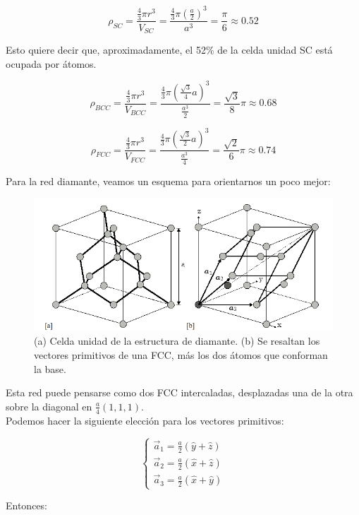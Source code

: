 \documentclass[a4paper]{article}
\begin{document}
$$ \rho_{SC} = \frac{\frac{4}{3}\pi r^{3}}{V_{SC}} = \frac{\frac{4}{3}\pi (\frac{a}{2})^{3}}{a^{3}} = \frac{\pi}{6} \approx 0.52$$

Esto quiere decir que, aproximadamente, el 52\% de la celda unidad SC est\'a ocupada por \'atomos.

$$ \rho_{BCC} = \frac{\frac{4}{3}\pi r^{3}}{V_{BCC}} = \frac{\frac{4}{3}\pi (\frac{\sqrt{3}}{4}a)^{3}}{\frac{a^{3}}{2}} = \frac{\sqrt{3}}{8}\pi \approx 0.68$$

$$ \rho_{FCC} = \frac{\frac{4}{3}\pi r^{3}}{V_{FCC}} = \frac{\frac{4}{3}\pi (\frac{\sqrt{3}}{2}a)^{3}}{\frac{a^{3}}{4}} = \frac{\sqrt{2}}{6}\pi \approx 0.74$$

Para la red diamante, veamos un esquema para orientarnos un poco mejor:

\begin{figure}[H]
  \centering
  \includegraphics[width=0.9\linewidth,height=0.5\linewidth]{red3d_diamante.png}
  \caption{(a) Celda unidad de la estructura de diamante. (b) Se resaltan los vectores primitivos de una FCC, m\'as los dos \'atomos que conforman la base.}
  \label{fig:red3d_diamante}
\end{figure}

Esta red puede pensarse como dos FCC intercaladas, desplazadas una de la otra sobre la diagonal en $\frac{a}{4}(1, 1, 1)$.\\

Podemos hacer la siguiente elecci\'on para los vectores primitivos:

$$\begin{cases}
\vec{a}_{1} = \frac{a}{2}(\hat{y} + \hat{z}) \\
\vec{a}_{2} = \frac{a}{2}(\hat{x} + \hat{z}) \\
\vec{a}_{3} = \frac{a}{2}(\hat{x} + \hat{y})
\end{cases}$$

Entonces:
\end{document}
